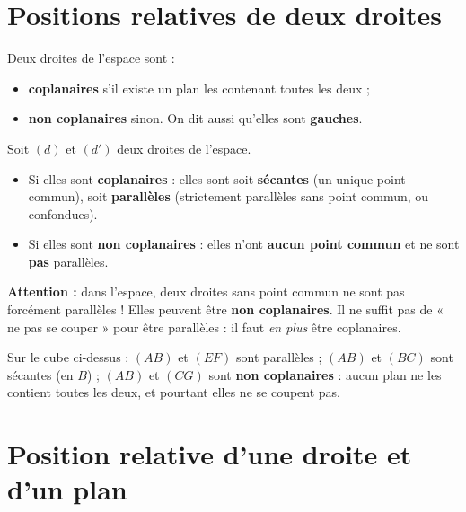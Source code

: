 \section{Positions relatives de deux droites}

\begin{definition}
Deux droites de l'espace sont :
\begin{itemize}
  \item \textbf{coplanaires} s'il existe un plan les contenant toutes les deux ;
  \item \textbf{non coplanaires} sinon. On dit aussi qu'elles sont
        \textbf{gauches}.
\end{itemize}
\end{definition}

\begin{propriete}
Soit $(d)$ et $(d')$ deux droites de l'espace.
\begin{itemize}
  \item Si elles sont \textbf{coplanaires} : elles sont soit \textbf{sécantes}
        (un unique point commun), soit \textbf{parallèles} (strictement parallèles
        sans point commun, ou confondues).
  \item Si elles sont \textbf{non coplanaires} : elles n'ont \textbf{aucun point
        commun} et ne sont \textbf{pas} parallèles.
\end{itemize}
\end{propriete}

\begin{aretenir}
\textbf{Attention :} dans l'espace, deux droites sans point commun ne sont pas
forcément parallèles ! Elles peuvent être \textbf{non coplanaires}. Il ne suffit
pas de « ne pas se couper » pour être parallèles : il faut \emph{en plus} être
coplanaires.
\end{aretenir}

\begin{exemple}
Sur le cube ci-dessus : $(AB)$ et $(EF)$ sont parallèles ; $(AB)$ et $(BC)$ sont
sécantes (en $B$) ; $(AB)$ et $(CG)$ sont \textbf{non coplanaires} : aucun plan ne
les contient toutes les deux, et pourtant elles ne se coupent pas.
\end{exemple}

\section{Position relative d'une droite et d'un plan}

